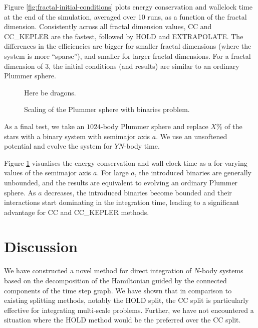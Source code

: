 \documentclass[referee]{aa}
\begin{document}
Figure \ref{fig:fractal-initial-conditions} plots energy conservation
and wallclock time at the end of the simulation, averaged over 10
runs, as a function of the fractal dimension. Consistently across
all fractal dimension values, CC and CC\_KEPLER are the fastest, followed
by HOLD and EXTRAPOLATE. The differences in the efficiencies are bigger
for smaller fractal dimensions (where the system is more ``sparse''),
and smaller for larger fractal dimensions. For a fractal dimension
of $3$, the initial conditions (and results) are similar to an ordinary
Plummer sphere.

\begin{figure}[p]
\begin{centering}
Here be dragons.
\par\end{centering}

\caption{\label{fig:plummer-of-binaries-scaling}Scaling of the Plummer sphere
with binaries problem.}
\end{figure}


As a final test, we take an $1024$-body Plummer sphere and replace
$X\%$ of the stars with a binary system with semimajor axis $a$.
We use an unsoftened potential and evolve the system for $Y$$N$-body
time.

Figure \ref{fig:plummer-of-binaries-scaling} visualises the energy
conservation and wall-clock time as a for varying values of the semimajor
axis $a$. For large $a$, the introduced binaries are generally unbounded,
and the results are equivalent to evolving an ordinary Plummer sphere.
As $a$ decreases, the introduced binaries become bounded and their
interactions start dominating in the integration time, leading to
a significant advantage for CC and CC\_KEPLER methods.

\section{Discussion}

We have constructed a novel method for direct integration of $N$-body
systems based on the decomposition of the Hamiltonian guided by the
connected components of the time step graph. We have shown that in
comparison to existing splitting methods, notably the HOLD split,
the CC split is particularly effective for integrating multi-scale
problems. Further, we have not encountered a situation where the HOLD
method would be the preferred over the CC split.
\end{document}
